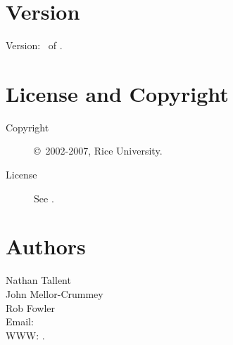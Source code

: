 \documentclass[english]{article}
\begin{document}
\section{Version}

Version: \Version\ of \Date.

\section{License and Copyright}

\begin{description}
\item[Copyright] \copyright\ 2002-2007, Rice University.
\item[License] See .
\end{description}

\section{Authors}

\noindent
Nathan Tallent \\
John Mellor-Crummey \\
Rob Fowler \\
Email:  \\
WWW: .

\LatexManEnd
\end{document}
